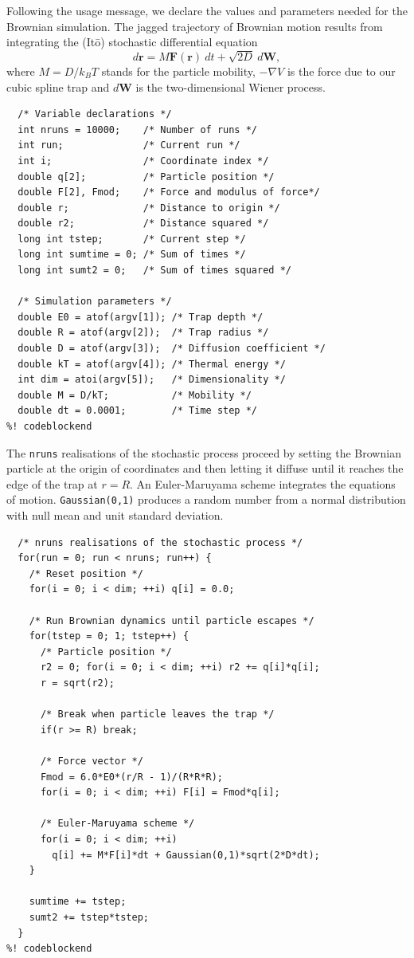 \documentclass{article}
\begin{document}
Following the usage message, we declare the values and parameters needed for the
Brownian simulation. The jagged trajectory of Brownian motion results from
integrating the (It\=o) stochastic differential equation
\begin{equation}
  d\mathbf{r} = M \mathbf{F}(\mathbf{r})\ dt + \sqrt{2 D}\ d\mathbf{W},
\end{equation}
where $M = D/k_BT$ stands for the particle mobility, $-\nabla V$ is the force
due to our cubic spline trap and $d\mathbf{W}$ is the two-dimensional Wiener
process.

\begin{lstlisting}[frame=single]
%! codeblock: variable_declarations
  /* Variable declarations */
  int nruns = 10000;    /* Number of runs */
  int run;              /* Current run */
  int i;                /* Coordinate index */
  double q[2];          /* Particle position */
  double F[2], Fmod;    /* Force and modulus of force*/
  double r;             /* Distance to origin */
  double r2;            /* Distance squared */
  long int tstep;       /* Current step */
  long int sumtime = 0; /* Sum of times */
  long int sumt2 = 0;   /* Sum of times squared */

  /* Simulation parameters */
  double E0 = atof(argv[1]); /* Trap depth */
  double R = atof(argv[2]);  /* Trap radius */
  double D = atof(argv[3]);  /* Diffusion coefficient */
  double kT = atof(argv[4]); /* Thermal energy */
  int dim = atoi(argv[5]);   /* Dimensionality */
  double M = D/kT;           /* Mobility */
  double dt = 0.0001;        /* Time step */
%! codeblockend
\end{lstlisting}

The \texttt{nruns} realisations of the stochastic process proceed by setting the
Brownian particle at the origin of coordinates and then letting it diffuse until
it reaches the edge of the trap at $r = R$. An Euler-Maruyama scheme integrates
the equations of motion. \texttt{Gaussian(0,1)} produces a random number from a
normal distribution with null mean and unit standard deviation.

\begin{lstlisting}[frame=single]
%! codeblock: Brownian_simulation
  /* nruns realisations of the stochastic process */
  for(run = 0; run < nruns; run++) {
    /* Reset position */
    for(i = 0; i < dim; ++i) q[i] = 0.0;

    /* Run Brownian dynamics until particle escapes */
    for(tstep = 0; 1; tstep++) {
      /* Particle position */
      r2 = 0; for(i = 0; i < dim; ++i) r2 += q[i]*q[i];
      r = sqrt(r2);

      /* Break when particle leaves the trap */
      if(r >= R) break;

      /* Force vector */
      Fmod = 6.0*E0*(r/R - 1)/(R*R*R);
      for(i = 0; i < dim; ++i) F[i] = Fmod*q[i];

      /* Euler-Maruyama scheme */
      for(i = 0; i < dim; ++i)
        q[i] += M*F[i]*dt + Gaussian(0,1)*sqrt(2*D*dt);
    }

    sumtime += tstep;
    sumt2 += tstep*tstep;
  }
%! codeblockend
\end{lstlisting}
\end{document}
